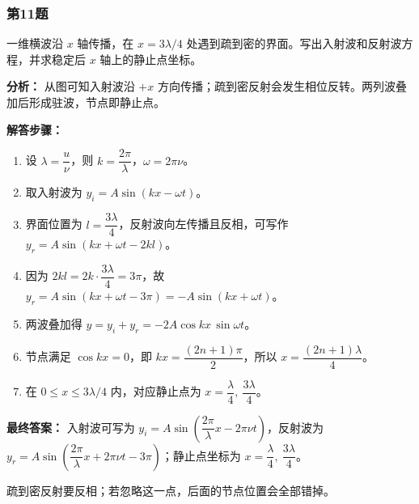 \documentclass[12pt,a4paper]{ctexart}
\begin{document}
\subsubsection*{第11题}
\begin{tcolorbox}[colback=gray!2!white,colframe=black!60,title={题目}]
一维横波沿 \(x\) 轴传播，在 \(x=3\lambda/4\) 处遇到疏到密的界面。写出入射波和反射波方程，并求稳定后 \(x\) 轴上的静止点坐标。\par
\end{tcolorbox}
\begin{tcolorbox}[colback=blue!2!white,colframe=blue!55!black,title={完整答案}]
\textbf{分析：}
从图可知入射波沿 \(+x\) 方向传播；疏到密反射会发生相位反转。两列波叠加后形成驻波，节点即静止点。\par
\textbf{解答步骤：}
\begin{enumerate}
\item 设 \(\lambda=\dfrac{u}{\nu}\)，则 \(k=\dfrac{2\pi}{\lambda}\)，\(\omega=2\pi\nu\)。
\item 取入射波为 \(y_i=A\sin(kx-\omega t)\)。
\item 界面位置为 \(l=\dfrac{3\lambda}{4}\)，反射波向左传播且反相，可写作 \(y_r=A\sin(kx+\omega t-2kl)\)。
\item 因为 \(2kl=2k\cdot \dfrac{3\lambda}{4}=3\pi\)，故 \(y_r=A\sin(kx+\omega t-3\pi)=-A\sin(kx+\omega t)\)。
\item 两波叠加得 \(y=y_i+y_r=-2A\cos kx\,\sin\omega t\)。
\item 节点满足 \(\cos kx=0\)，即 \(kx=\dfrac{(2n+1)\pi}{2}\)，所以 \(x=\dfrac{(2n+1)\lambda}{4}\)。
\item 在 \(0\le x\le 3\lambda/4\) 内，对应静止点为 \(x=\dfrac{\lambda}{4},\ \dfrac{3\lambda}{4}\)。
\end{enumerate}
\textbf{最终答案：}
入射波可写为 \(y_i=A\sin\!\left(\dfrac{2\pi}{\lambda}x-2\pi\nu t\right)\)，反射波为 \(y_r=A\sin\!\left(\dfrac{2\pi}{\lambda}x+2\pi\nu t-3\pi\right)\)；静止点坐标为 \(x=\dfrac{\lambda}{4},\ \dfrac{3\lambda}{4}\)。\par
\end{tcolorbox}
\begin{tcolorbox}[colback=red!2!white,colframe=red!55!black,title={易错点}]
疏到密反射要反相；若忽略这一点，后面的节点位置会全部错掉。\par
\end{tcolorbox}
\end{document}
